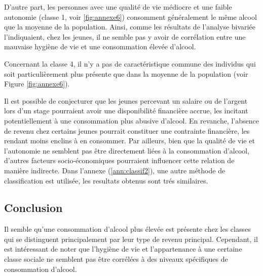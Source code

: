 \documentclass{article}
\begin{document}
D'autre part, les personnes avec une qualité de vie médiocre et une faible autonomie (classe 1, voir \ref{fig:annexe6}) consomment généralement le même alcool que la moyenne de la population. Ainsi, comme les résultats de l'analyse bivariée l'indiquaient, chez les jeunes, il ne semble pas y avoir de corrélation entre une mauvaise hygiène de vie et une consommation élevée d'alcool.

Concernant la classe 4, il n'y a pas de caractéristique commune des individus qui soit particulièrement plus présente que dans la moyenne de la population (voir Figure \ref{fig:annexe6}).

Il est possible de conjecturer que les jeunes percevant un salaire ou de l'argent lors d'un stage pourraient avoir une disponibilité financière accrue, les incitant potentiellement à une consommation plus abusive d'alcool. En revanche, l'absence de revenu chez certains jeunes pourrait constituer une contrainte financière, les rendant moins enclins à en consommer. Par ailleurs, bien que la qualité de vie et l'autonomie ne semblent pas être directement liées à la consommation d'alcool, d'autres facteurs socio-économiques pourraient influencer cette relation de manière indirecte. Dans l'annexe (\ref{ann:classif2}), une autre méthode de classification est utilisée, les resultats obtenus sont trés similaires.

\subsection{Conclusion}

Il semble qu'une consommation d'alcool plus élevée est présente chez les classes qui se distinguent principalement par leur type de revenu principal. Cependant, il est intéressant de noter que l'hygiène de vie et l'appartenance à une certaine classe sociale ne semblent pas être corrélées à des niveaux spécifiques de consommation d'alcool.
\end{document}
